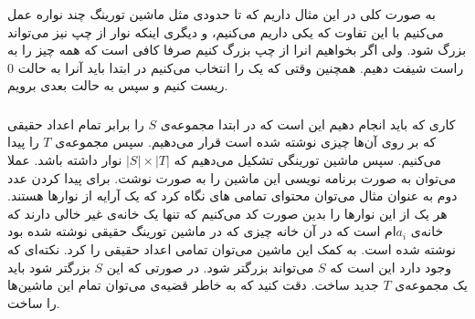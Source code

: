 به صورت کلی در این مثال داریم که تا حدودی مثل ماشین تورینگ چند نواره عمل می‌کنیم با این تفاوت که یکی
داریم می‌کنیم، و دیگری اینکه نوار از چپ نیز می‌تواند بزرگ شود. ولی اگر بخواهیم انرا از چپ بزرگ کنیم صرفا
کافی است که همه چیز را به راست شیفت دهیم. همچنین وقتی که یک
را انتخاب می‌کنیم در ابتدا باید آنرا به حالت 0 ریست کنیم و سپس به حالت
بعدی برویم.
\subsubsection{}
کاری که باید انجام دهیم این است که در ابتدا مجموعه‌ی
$S$
را برابر تمام اعداد حقیقی که بر روی آن‌ها چیزی نوشته شده است قرار می‌دهیم. سپس مجموعه‌ی
$T$
را پیدا می‌کنیم. سپس ماشین تورینگی تشکیل می‌دهیم که
$|S| \times |T|$
نوار داشته باشد. عملا می‌توان به صورت برنامه نویسی این ماشین را به صورت
نوشت. برای پیدا کردن عدد دوم به عنوان مثال می‌توان محتوای تمامی
های
نگاه کرد که یک آرایه از نوارها هستند. هر یک از این نوار‌ها را بدین صورت کد می‌کنیم که تنها یک خانه‌ی
غیر خالی دارند که خانه‌ی
$a_i$ام
است که در آن خانه چیزی که در ماشین تورینگ حقیقی نوشته شده بود نوشته شده است.
به کمک این ماشین می‌توان تمامی اعداد حقیقی را
کرد.
نکته‌ای که وجود دارد این است که
$S$
می‌تواند بزرگتر شود. در صورتی که این
$S$
بزرگتر شود باید یک مجموعه‌ی
$T$
جدید ساخت. دقت کنید که به خاطر قضیه‌ی
می‌توان تمام این ماشین‌ها را
ساخت.